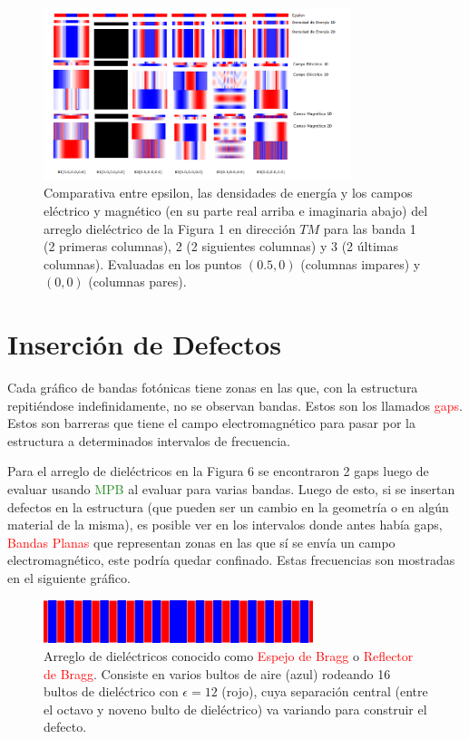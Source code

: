 \documentclass{book}
\begin{document}
\begin{figure}[ht]
 \centering
   \includegraphics[width=0.80\textwidth]{DirTM.png}
   \caption{Comparativa entre epsilon, las densidades de energía y los campos eléctrico y magnético (en su parte real arriba e imaginaria abajo) del arreglo dieléctrico de la Figura 1 en dirección $TM$ para las banda 1 (2 primeras columnas), 2 (2 siguientes columnas) y 3 (2 últimas columnas). Evaluadas en los puntos $(0.5,0)$ (columnas impares) y $(0,0)$ (columnas pares).}
\end{figure}
\pagebreak 
\section{Inserción de Defectos}

Cada gráfico de bandas fotónicas tiene zonas en las que, con la estructura repitiéndose indefinidamente, no se observan bandas. Estos son los llamados \textcolor{red}{gaps}. Estos son barreras que tiene el campo electromagnético para pasar por la estructura a determinados intervalos de frecuencia.  

Para el arreglo de dieléctricos en la Figura 6 se encontraron 2 gaps luego de evaluar usando \textcolor{ForestGreen}{MPB} al evaluar para varias bandas. Luego de esto, si se insertan defectos en la estructura (que pueden ser un cambio en la geometría o en algún material de la misma), es posible ver en los intervalos  donde antes había gaps, \textcolor{red}{Bandas Planas} que representan zonas en las que sí se envía un campo electromagnético, este podría quedar confinado. Estas frecuencias son mostradas en el siguiente gráfico.
\begin{figure}[ht]
 \centering
   \includegraphics[width=0.70\textwidth]{caveps.png}
   \caption{Arreglo de dieléctricos conocido como \textcolor{red}{Espejo de Bragg} o \textcolor{red}{Reflector de Bragg}. Consiste en varios bultos de aire (azul) rodeando 16 bultos de dieléctrico con $\epsilon=12$ (rojo), cuya separación central (entre el octavo y noveno bulto de dieléctrico) va variando para construir el defecto. }
\end{figure}
\end{document}
